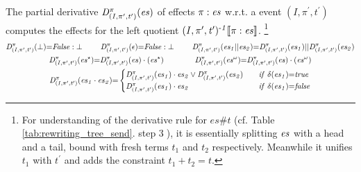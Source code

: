 \documentclass[acmsmall,10pt,review]{acmart}
\newcommand{\es}{\textcolor{black}{\ensuremath{{es}}}}
\newcommand{\timedEffects}{\emph{TimEffs}}
\newcommand{\seq}{\cdot}
\newcommand{\code}[1]{{\tt{\ensuremath{\m{#1}}}}}
\newcommand{\esn}[2]{\ensuremath{#1^{#2}}}
\newcommand{\empt}{\textcolor{black}{\ensuremath{\epsilon}}}
\newcommand{\bott}{\textcolor{black}{\ensuremath{\bot}}}
\newcommand{\m}{\mathit}
\newcommand\tabref[1]{Table \textcolor{black}{\ref{#1}}.}
\begin{document}
{\begin{definition}[Partial Derivative\footnote{Intuitively, the partial derivative refers to the left quotient of a language equation, for example, for REs, \code{x^{{-}1} \llbracket x\cdot y\rrbracket {=} y};  \code{y^{{-}1} \llbracket x\cdot y\rrbracket {=} \bott}; and  \code{y^{{-}1} \llbracket x + y\rrbracket {=} \epsilon}. Here we come up with a new notion of partial derivative for \timedEffects. 
}]\label{Derivative}
The partial derivative \code{D^{\pi}_{(I, \pi^\prime, t^\prime)}(\es)} 
of effects \code{\pi : \es} 
w.r.t. a event \code{(I, \pi^\prime, t^\prime)} computes the  effects for the left quotient \code{(I, \pi^\prime, t^\prime)^{\text{-}1}\llbracket \pi : \es \rrbracket}. \footnote{For understanding of the derivative rule for \code{es\# t} (cf. \tabref{tab:rewriting_tree_send}  step \textcircled{3}), it is essentially splitting \code{\es} with a head and a tail, bound with fresh terms \code{t_1} and \code{t_2} respectively. Meanwhile it unifies \code{t_1} with \code{t^\prime} and  adds the constraint \code{t_1 {+} t_2 {=} t}.}
\begin{gather*}
\code{D^{\pi}_{(I, \pi^\prime, t^\prime)}(\bott) {=}}  
 \code{False : \bott} 
\qquad\ 
\code{D^{\pi}_{(I, \pi^\prime, t^\prime)}(  \empt) {=}}   
\code{False : \bott} 
\qquad \ 
\code{D^{\pi}_{(I, \pi^\prime, t^\prime)}(es_1 || es_2)} {=} \code{D^{\pi}_{(I, \pi^\prime, t^\prime)}(es_1)} || \code{D^{\pi}_{(I, \pi^\prime, t^\prime)}( es_2)} 
    \\
        \code{D^{\pi}_{(I, \pi^\prime, t^\prime)}(  \esn{\es}{\star}) } {=} \code{ D^{\pi}_{(I, \pi^\prime, t^\prime)}(  {\es}) \cdot (\esn{\es}{\star})}  
        \qquad\qquad
                \code{D^{\pi}_{(I, \pi^\prime, t^\prime)}(  \esn{\es}{\omega}) } {=} \code{ D^{\pi}_{(I, \pi^\prime, t^\prime)}(  {\es}) \cdot (\esn{\es}{\omega})}  
\\
{
 \code{D^{\pi}_{(I, \pi^\prime, t^\prime)}(   \es_1 \seq \es_2) {=} }
\begin{cases}
      \code{D^{\pi}_{(I, \pi^\prime, t^\prime)}(   \es_1) \cdot  \es_2 \vee  D^{\pi}_{(I, \pi^\prime, t^\prime)}( \es_2)} \quad &\code{if\ \delta(\es_1) {=} true}   \\
      \code{D^{\pi}_{(I, \pi^\prime, t^\prime)}  ( \es_1) \cdot  \es_2} & \code{if\ \delta(\es_1) {=} false} 
    \end{cases} 
}
\end{gather*}
\end{definition}}
\end{document}
